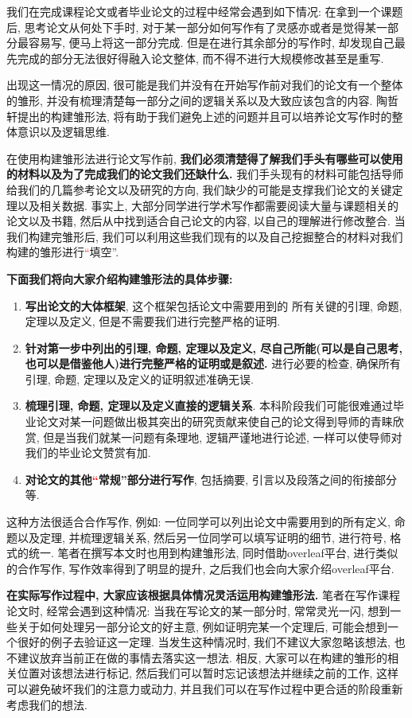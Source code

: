 \documentclass{formatBook}
\newcommand{\XG}[1]{\textcolor{red}{#1}}
\begin{document}
我们在完成课程论文或者毕业论文的过程中经常会遇到如下情况: 在拿到一个课题后, 思考论文从何处下手时, 对于某一部分如何写作有了灵感亦或者是觉得某一部分最容易写, 便马上将这一部分完成. 但是在进行其余部分的写作时, 却发现自己最先完成的部分无法很好得融入论文整体, 而不得不进行大规模修改甚至是重写. \par
出现这一情况的原因, 很可能是我们并没有在开始写作前对我们的论文有一个整体的雏形, 并没有梳理清楚每一部分之间的逻辑关系以及大致应该包含的内容. 陶哲轩提出的构建雏形法, 将有助于我们避免上述的问题并且可以培养论文写作时的整体意识以及逻辑思维. \par
在使用构建雏形法进行论文写作前, \textbf{我们必须清楚得了解我们手头有哪些可以使用的材料以及为了完成我们的论文我们还缺什么.} 我们手头现有的材料可能包括导师给我们的几篇参考论文以及研究的方向, 我们缺少的可能是支撑我们论文的关键定理以及相关数据. 事实上, 大部分同学进行学术写作都需要阅读大量与课题相关的论文以及书籍, 然后从中找到适合自己论文的内容, 以自己的理解进行修改整合. 当我们构建完雏形后, 我们可以利用这些我们现有的以及自己挖掘整合的材料对我们构建的雏形进行\XG{``}填空''. \par
\textbf{下面我们将向大家介绍构建雏形法的具体步骤: }
\begin{enumerate}
    \item \textbf{写出论文的大体框架}, 这个框架包括论文中需要用到的 所有关键的引理, 命题, 定理以及定义, 但是不需要我们进行完整严格的证明.
    \item \textbf{针对第一步中列出的引理, 命题, 定理以及定义, 尽自己所能(可以是自己思考, 也可以是借鉴他人)进行完整严格的证明或是叙述. }进行必要的检查, 确保所有引理, 命题, 定理以及定义的证明叙述准确无误.
    \item \textbf{梳理引理, 命题, 定理以及定义直接的逻辑关系}. 本科阶段我们可能很难通过毕业论文对某一问题做出极其突出的研究贡献来使自己的论文得到导师的青睐欣赏, 但是当我们就某一问题有条理地, 逻辑严谨地进行论述, 一样可以使导师对我们的毕业论文赞赏有加.
    \item \textbf{对论文的其他\XG{``}常规''部分进行写作}, 包括摘要, 引言以及段落之间的衔接部分等.
\end{enumerate}
\par
这种方法很适合合作写作, 例如: 一位同学可以列出论文中需要用到的所有定义, 命题以及定理, 并梳理逻辑关系, 然后另一位同学可以填写证明的细节, 进行符号, 格式的统一. 笔者在撰写本文时也用到构建雏形法, 同时借助overleaf平台, 进行类似的合作写作, 写作效率得到了明显的提升, 之后我们也会向大家介绍overleaf平台. \par
\textbf{在实际写作过程中, 大家应该根据具体情况灵活运用构建雏形法. }笔者在写作课程论文时, 经常会遇到这种情况: 当我在写论文的某一部分时, 常常灵光一闪, 想到一些关于如何处理另一部分论文的好主意, 例如证明完某一个定理后, 可能会想到一个很好的例子去验证这一定理. 当发生这种情况时, 我们不建议大家忽略该想法, 也不建议放弃当前正在做的事情去落实这一想法. 相反, 大家可以在构建的雏形的相关位置对该想法进行标记, 然后我们可以暂时忘记该想法并继续之前的工作, 这样可以避免破坏我们的注意力或动力, 并且我们可以在写作过程中更合适的阶段重新考虑我们的想法.
\end{document}
